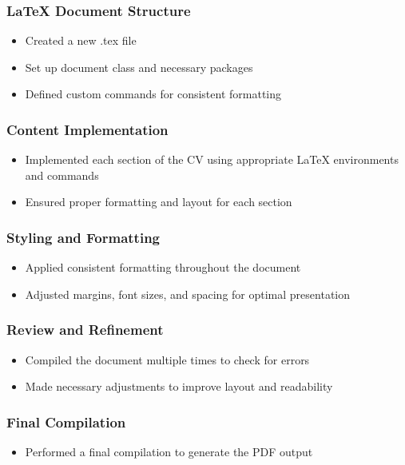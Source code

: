 \subsubsection{LaTeX Document Structure}
\begin{itemize}
    \item Created a new .tex file
    \item Set up document class and necessary packages
    \item Defined custom commands for consistent formatting
\end{itemize}

\subsubsection{Content Implementation}
\begin{itemize}
    \item Implemented each section of the CV using appropriate LaTeX environments and commands
    \item Ensured proper formatting and layout for each section
\end{itemize}

\subsubsection{Styling and Formatting}
\begin{itemize}
    \item Applied consistent formatting throughout the document
    \item Adjusted margins, font sizes, and spacing for optimal presentation
\end{itemize}

\subsubsection{Review and Refinement}
\begin{itemize}
    \item Compiled the document multiple times to check for errors
    \item Made necessary adjustments to improve layout and readability
\end{itemize}

\subsubsection{Final Compilation}
\begin{itemize}
    \item Performed a final compilation to generate the PDF output
\end{itemize}

